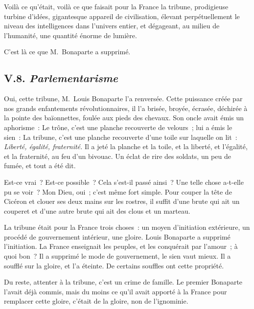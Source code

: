 \documentclass[french,twoside]{book} %
\begin{document}
Voilà ce qu’était, voilà ce que faisait pour la France la tribune, prodigieuse turbine d’idées, gigantesque appareil de civilisation, élevant perpétuellement le niveau des intelligences dans l’univers entier, et dégageant, au milieu de l’humanité, une quantité énorme de lumière.\par
C’est là ce que M. Bonaparte a supprimé.
\subsection[{V.8. Parlementarisme}]{V.8. \emph{Parlementarisme}}
\noindent Oui, cette tribune, M. Louis Bonaparte l’a renversée. Cette puissance créée par nos grands enfantements révolutionnaires, il l’a brisée, broyée, écrasée, déchirée à la pointe des baïonnettes, foulée aux pieds des chevaux. Son oncle avait émis un aphorisme : Le trône, c’est une planche recouverte de velours ; lui a émis le sien : La tribune, c’est une planche recouverte d’une toile sur laquelle on lit : \emph{Liberté, égalité, fraternité.} Il a jeté la planche et la toile, et la liberté, et l’égalité, et la fraternité, au feu d’un bivouac. Un éclat de rire des soldats, un peu de fumée, et tout a été dit.\par
Est-ce vrai ? Est-ce possible ? Cela s’est-il passé ainsi ? Une telle chose a-t-elle pu se voir ? Mon Dieu, oui ; c’est même fort simple. Pour couper la tête de Cicéron et clouer ses deux mains sur les rostres, il suffit d’une brute qui ait un couperet et d’une autre brute qui ait des clous et un marteau.\par
La tribune était pour la France trois choses : un moyen d’initiation extérieure, un procédé de gouvernement intérieur, une gloire. Louis Bonaparte a supprimé l’initiation. La France enseignait les peuples, et les conquérait par l’amour ; à quoi bon ? Il a supprimé le mode de gouvernement, le sien vaut mieux. Il a soufflé sur la gloire, et l’a éteinte. De certains souffles ont cette propriété.\par
Du reste, attenter à la tribune, c’est un crime de famille. Le premier Bonaparte l’avait déjà commis, mais du moins ce qu’il avait apporté à la France pour remplacer cette gloire, c’était de la gloire, non de l’ignominie.\par
\end{document}
